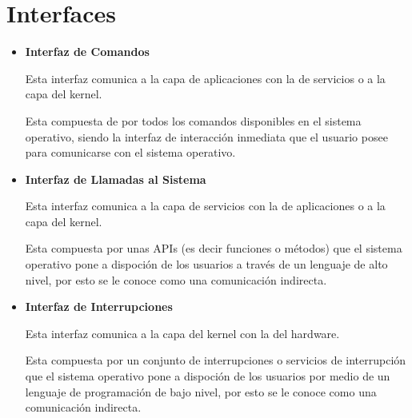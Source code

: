 \documentclass[12pt, fleqn]{report}                             %
\begin{document}
        \section{Interfaces}    
            
            \begin{itemize}
                \item
                    \textbf{Interfaz de Comandos}

                    Esta interfaz comunica a la capa de aplicaciones con la de
                    servicios o a la capa del kernel.

                    Esta compuesta de por todos los comandos disponibles en el sistema
                    operativo, siendo la interfaz de interacción inmediata que el usuario
                    posee para comunicarse con el sistema operativo.

                \item
                    \textbf{Interfaz de Llamadas al Sistema}

                    Esta interfaz comunica a la capa de servicios con la de
                    aplicaciones o a la capa del kernel.

                    Esta compuesta por unas APIs (es decir funciones o métodos)
                    que el sistema operativo pone a dispoción de los usuarios a
                    través de un lenguaje de alto nivel, por esto se le conoce como una
                    comunicación indirecta.

                \item
                    \textbf{Interfaz de Interrupciones}

                    Esta interfaz comunica a la capa del kernel con la del hardware.

                    Esta compuesta por un conjunto de interrupciones o servicios de 
                    interrupción que el sistema operativo pone a dispoción de los
                    usuarios por medio de un lenguaje de programación de bajo nivel,
                    por esto se le conoce como una comunicación indirecta.

            \end{itemize}



\end{document}
